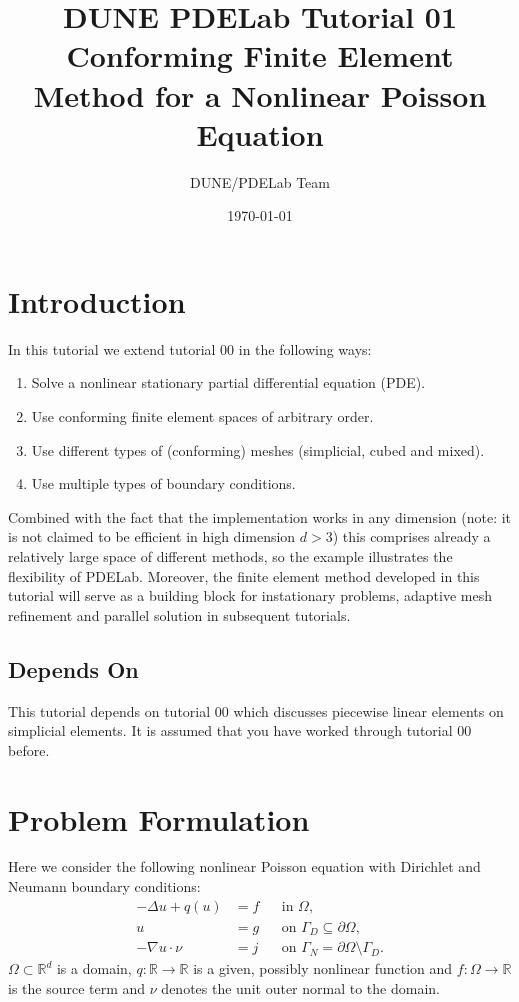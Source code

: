 \documentclass[a4paper,12pt]{article}
\title{DUNE PDELab Tutorial 01 \\ 
Conforming Finite Element Method for a Nonlinear Poisson Equation}
\author{DUNE/PDELab Team}
\date{\today}
\begin{document}
\maketitle
\tableofcontents
\clearpage

\section{Introduction}

In this tutorial we extend tutorial 00 in the following ways:
\begin{enumerate}[1)]
\item Solve a nonlinear stationary partial differential equation (PDE).
\item Use conforming finite element spaces of arbitrary order.
\item Use different types of (conforming) meshes (simplicial, cubed and mixed).
\item Use multiple types of boundary conditions.
\end{enumerate}
Combined with the fact that the implementation works in any dimension
(note: it is not claimed to be efficient in high dimension $d>3$) this comprises
already a relatively large space of different methods, so the example illustrates
the flexibility of PDELab. Moreover, the 
finite element method developed in this tutorial will serve as a 
building block for instationary problems, adaptive mesh refinement and
parallel solution in subsequent tutorials.

\subsection*{Depends On} 

This tutorial depends on tutorial 00 which discusses piecewise linear elements on simplicial
elements. It is assumed that you have worked through tutorial 00 before.

\section{Problem Formulation}

Here we consider the following nonlinear Poisson equation with
Dirichlet and Neumann boundary conditions:
\begin{subequations} \label{eq:ProblemStrong}
\begin{align}
-\Delta u + q(u) &= f &&\text{in $\Omega$},\\
u &= g &&\text{on $\Gamma_D\subseteq\partial\Omega$},\\
-\nabla u\cdot \nu &= j &&\text{on $\Gamma_N=\partial\Omega\setminus\Gamma_D$}.
\end{align}
\end{subequations}
$\Omega\subset\mathbb{R}^d$ is a domain, $q:\mathbb{R}\to\mathbb{R}$ is a given, possibly
nonlinear function and $f: \Omega\to\mathbb{R}$ is the source term and
$\nu$ denotes the unit outer normal to the domain.
\end{document}
